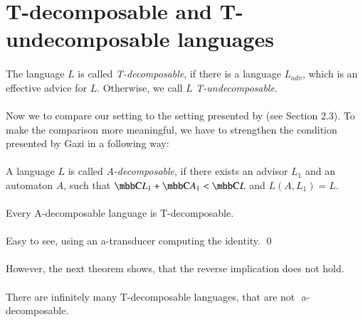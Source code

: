 \section{T-decomposable and T-undecomposable languages}

\paragraph{}
\cdefinicia The language $L$ is called \emph{T-decomposable}, if there is a language $L_{adv}$, which is an effective advice for $L$. Otherwise, we call $L$ \emph{T-undecomposable}.

\paragraph{}
Now we to compare our setting to the setting presented by \cite{Gazi} (see Section 2.3). To make the comparison more meaningful, we have to strengthen the condition presented by Gazi in a following way:

\paragraph{}
\cdefinicia A language $L$ is called \emph{A-decomposable}, if there exists an advisor $L_1$ and an automaton $A$, such that $\C{L_1} + \C{A_1} < \C{L}$ and $L(A, L_1) = L$.

\paragraph{}
\cveta Every A-decomposable language is T-decomposable.

\paragraph{}
\dokaz Easy to see, using an a-transducer computing the identity. \qed

\paragraph{}
However, the next theorem shows, that the reverse implication does not hold.

\paragraph{}
\cveta There are infinitely many T-decomposable languages, that are not $\allowbreak$ a-decomposable.

